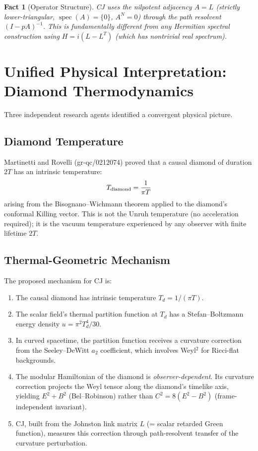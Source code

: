\documentclass[11pt,a4paper]{article}
\newtheorem{fact}{Fact}
\begin{document}
\begin{fact}[Operator Structure]
CJ uses the nilpotent adjacency $A = L$ (strictly lower-triangular, $\operatorname{spec}(A) = \{0\}$, $A^N = 0$) through the path resolvent $(I - pA)^{-1}$. This is fundamentally different from any Hermitian spectral construction using $H = i(L - L^T)$ (which has nontrivial real spectrum).
\end{fact}

\section{Unified Physical Interpretation: Diamond Thermodynamics}

Three independent research agents identified a convergent physical picture.

\subsection{Diamond Temperature}

Martinetti and Rovelli (gr-qc/0212074) proved that a causal diamond of duration $2T$ has an intrinsic temperature:
\begin{equation}
T_{\rm diamond} = \frac{1}{\pi T}
\end{equation}
arising from the Bisognano--Wichmann theorem applied to the diamond's conformal Killing vector. This is not the Unruh temperature (no acceleration required); it is the vacuum temperature experienced by any observer with finite lifetime $2T$.

\subsection{Thermal-Geometric Mechanism}

The proposed mechanism for CJ is:

\begin{enumerate}
\item The causal diamond has intrinsic temperature $T_d = 1/(\pi T)$.
\item The scalar field's thermal partition function at $T_d$ has a Stefan--Boltzmann energy density $u = \pi^2 T_d^4 / 30$.
\item In curved spacetime, the partition function receives a curvature correction from the Seeley--DeWitt $a_2$ coefficient, which involves Weyl$^2$ for Ricci-flat backgrounds.
\item The modular Hamiltonian of the diamond is \emph{observer-dependent}. Its curvature correction projects the Weyl tensor along the diamond's timelike axis, yielding $E^2 + B^2$ (Bel--Robinson) rather than $C^2 = 8(E^2-B^2)$ (frame-independent invariant).
\item CJ, built from the Johnston link matrix $L$ (= scalar retarded Green function), measures this correction through path-resolvent transfer of the curvature perturbation.
\end{enumerate}
\end{document}
